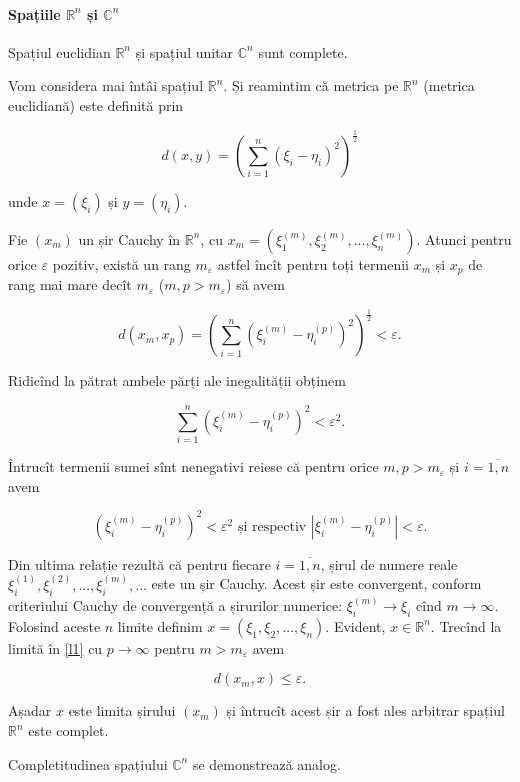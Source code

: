 \documentclass[a4paper,12pt]{article}
\theoremstyle{change}
\newenvironment{proof}[1][Proof]{\begin{trivlist}
\item[\hskip \labelsep {\bfseries #1}]}{\end{trivlist}}
\begin{document}
\paragraph{Spațiile $\mathbb{R}^n$ și $\mathbb{C}^n$} Spațiul euclidian $\mathbb{R}^n$ și spațiul unitar $\mathbb{C}^n$ sunt complete.

\begin{proof}[Într-adevăr]
Vom considera mai întâi spațiul $\mathbb{R}^n$.
Și reamintim că metrica pe $\mathbb{R}^n$ (metrica euclidiană) este definită prin 

\[ d(x,y) = \left(\sum_{i=1}^n (\xi_i - \eta_i)^2\right)^\frac{1}{2} \]

\noindent unde $x=(\xi_i)$ și $y=(\eta_i)$. 

Fie $(x_m)$ un șir Cauchy în $\mathbb{R}^n$, cu $x_m=(\xi_1^{(m)},\xi_2^{(m)},...,\xi_n^{(m)})$. Atunci pentru orice $\varepsilon$ pozitiv, există un rang $m_{\varepsilon}$ astfel încît pentru toți termenii $x_m$ și $x_p$ de rang mai mare decît $m_{\varepsilon}$ ($m,p>m_{\varepsilon}$) să avem

\begin{equation}\label{l1}
d(x_m,x_p) = \left(\sum_{i=1}^n (\xi_i^{(m)}-\eta_i^{(p)})^2\right)^\frac{1}{2} < \varepsilon.
\end{equation}

Ridicînd la pătrat ambele părți ale inegalității obținem

\[ \sum_{i=1}^n (\xi_i^{(m)}-\eta_i^{(p)})^2 < \varepsilon^2. \]

Întrucît termenii sumei sînt nenegativi reiese că pentru orice $m,p>m_\varepsilon$ și $i=\overline{1,n}$ avem

\[ (\xi_i^{(m)}-\eta_i^{(p)})^2 < \varepsilon^2 \text{ și respectiv } |\xi_i^{(m)}-\eta_i^{(p)}| < \varepsilon. \]

Din ultima relație rezultă că pentru fiecare $i=\overline{1,n}$,  șirul de numere reale $\xi_i^{(1)}, \xi_i^{(2)}, ..., \xi_i^{(m)}, ...$ este un șir Cauchy. Acest șir este convergent, conform criteriului Cauchy de convergență a șirurilor numerice: $\xi_i^{(m)}\to \xi_i$ cînd $m\to\infty$. Folosind aceste $n$ limite definim $x=(\xi_1,\xi_2,...,\xi_n)$. Evident, $x\in\mathbb{R}^n$. Trecînd la limită în \eqref{l1} cu $p\to\infty$ pentru $m>m_\varepsilon$ avem

\[ d(x_m,x)\leq\varepsilon. \]

Așadar $x$ este limita șirului $(x_m)$ și întrucît acest șir a fost ales arbitrar spațiul $\mathbb{R}^n$ este complet.

Completitudinea spațiului $\mathbb{C}^n$ se demonstrează analog.

\end{proof}
\end{document}
